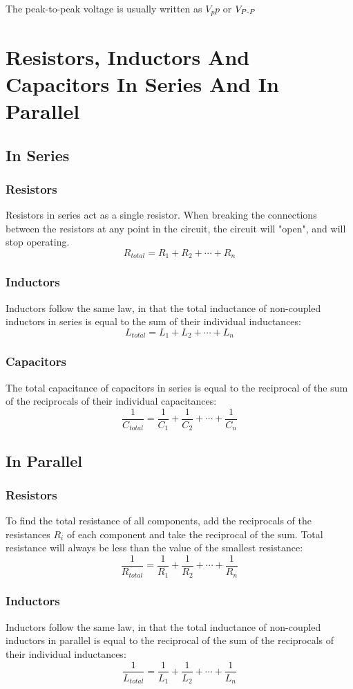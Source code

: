 \documentclass[12pt,a4paper,oneside]{article}
\begin{document}
The peak-to-peak voltage is usually written as \(V_pp\) or \(V_{P\text-P}\)
\section{Resistors, Inductors And Capacitors In Series And In Parallel}
\subsection{In Series}
\subsubsection{Resistors}
Resistors in series act as a single resistor. When breaking the connections between the resistors at any point in the circuit, the circuit will "open", and will stop operating.
\[
	R_{total} = R_1 + R_2 + \cdots + R_n
\]
\subsubsection{Inductors}
Inductors follow the same law, in that the total inductance of non-coupled inductors in series is equal to the sum of their individual inductances:
\[
	L_{total} = L_1 + L_2 + \cdots + L_n
\]
\subsubsection{Capacitors}
The total capacitance of capacitors in series is equal to the reciprocal of the sum of the reciprocals of their individual capacitances:
\[
	\frac{1}{C_{total}} = \frac{1}{C_1} + \frac{1}{C_2} + \cdots + \frac{1}{C_n}
\]
\subsection{In Parallel}
\subsubsection{Resistors}
To find the total resistance of all components, add the reciprocals of the resistances \(R_i\) of each component and take the reciprocal of the sum. Total resistance will always be less than the value of the smallest resistance:
\[
	\frac{1}{R_{total}} = \frac{1}{R_1} + \frac{1}{R_2} + \cdots + \frac{1}{R_n}
\]
\subsubsection{Inductors}
Inductors follow the same law, in that the total inductance of non-coupled inductors in parallel is equal to the reciprocal of the sum of the reciprocals of their individual inductances:
\[
	\frac{1}{L_{total}} = \frac{1}{L_1} + \frac{1}{L_2} + \cdots + \frac{1}{L_n}
\]
\end{document}
